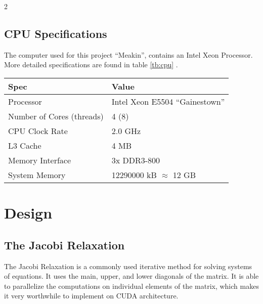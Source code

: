 \documentclass[10pt]{article}
\begin{document}
\begin{multicols}{2}
  \subsection{CPU Specifications}
  The computer used for this project ``Meakin'', contains an Intel Xeon Processor. More detailed specifications are found in table \ref{tb:cpu} \cite{bib:xeon}.
  \begin{table*}[!ht]\centering
    \begin{tabular}{@{}l l@{}}\toprule
      \bf{Spec}                     &   \bf{Value}                      \\
      \hline
      Processor                     &   Intel Xeon E5504 ``Gainestown'' \\
      Number of Cores (threads)     &   4 (8)                           \\
      CPU Clock Rate                &   2.0 GHz                         \\
      L3 Cache                      &   4 MB                            \\
      Memory Interface              &   3x DDR3-800                     \\
      System Memory                 &   12290000 kB $\approx$ 12 GB     \\
      \hline
    \end{tabular}
    \caption{Meakin CPU specifications}
    \label{tb:cpu}
  \end{table*}

  \section{Design}
  \label{sec:design}
  \subsection{The Jacobi Relaxation}
  The Jacobi Relaxation is a commonly used iterative method for solving systems of equations.
  It uses the main, upper, and lower diagonals of the matrix.
  It is able to parallelize the computations on individual elements of the matrix, which makes it very worthwhile to implement on CUDA architecture.


\end{multicols}
\end{document}
